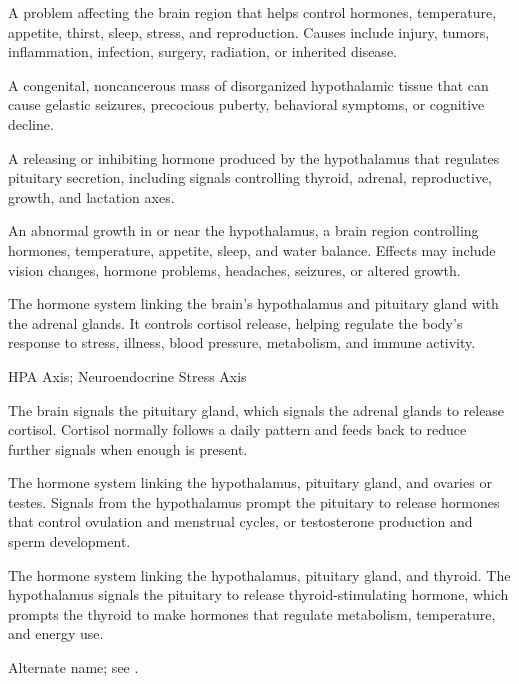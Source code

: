  A problem affecting the brain region that helps control hormones, temperature, appetite, thirst, sleep, stress, and reproduction. Causes include injury, tumors, inflammation, infection, surgery, radiation, or inherited disease.

 A congenital, noncancerous mass of disorganized hypothalamic tissue that can cause gelastic seizures, precocious puberty, behavioral symptoms, or cognitive decline.

 A releasing or inhibiting hormone produced by the hypothalamus that regulates pituitary secretion, including signals controlling thyroid, adrenal, reproductive, growth, and lactation axes.

 An abnormal growth in or near the hypothalamus, a brain region controlling hormones, temperature, appetite, sleep, and water balance. Effects may include vision changes, hormone problems, headaches, seizures, or altered growth.

 The hormone system linking the brain’s hypothalamus and pituitary gland with the adrenal glands. It controls cortisol release, helping regulate the body’s response to stress, illness, blood pressure, metabolism, and immune activity.

\synonyms
HPA Axis; Neuroendocrine Stress Axis

 The brain signals the pituitary gland, which signals the adrenal glands to release cortisol. Cortisol normally follows a daily pattern and feeds back to reduce further signals when enough is present.

 The hormone system linking the hypothalamus, pituitary gland, and ovaries or testes. Signals from the hypothalamus prompt the pituitary to release hormones that control ovulation and menstrual cycles, or testosterone production and sperm development.

 The hormone system linking the hypothalamus, pituitary gland, and thyroid. The hypothalamus signals the pituitary to release thyroid-stimulating hormone, which prompts the thyroid to make hormones that regulate metabolism, temperature, and energy use.

 Alternate name; see .

